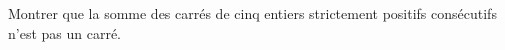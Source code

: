 Montrer que la somme des carrés de cinq entiers strictement positifs consécutifs n'est pas un carré.
